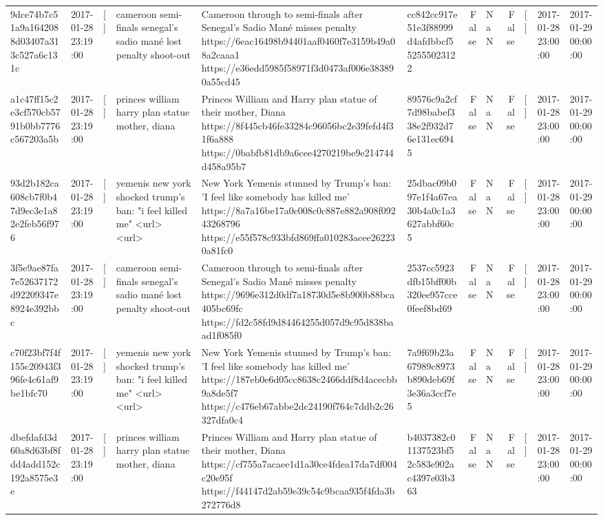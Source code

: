 \begin{tabular}{llllllrlrlll}
9dce74b7c51a9a1642088d03407a313c527a6c131c & 2017-01-28 23:19:00 & [] & cameroon semi-finals senegal's sadio mané lost penalty shoot-out & Cameroon through to semi-finals after Senegal’s Sadio Mané misses penalty https://6eac16498b94401aaf0460f7e3159b49a08a2caaa1 https://e36edd5985f58971f3d0473af006e383890a55cd45 & cc842cc917e51e3f88999d4afdbbcf552555023122 & False & NaN & False & [] & 2017-01-28 23:00:00 & 2017-01-29 00:00:00 \\
a1c47ff15c2e3cf570cb5791b0bb7776c567203a5b & 2017-01-28 23:19:00 & [] & princes william harry plan statue mother, diana & Princes William and Harry plan statue of their mother, Diana https://8f445cb46fe33284c96056bc2e39fefd4f31f6a888 https://0babfb81db9a6cee4270219be9e214744d458a95b7 & 89576c9a2cf7d98babef338e2f932d76e131ec6945 & False & NaN & False & [] & 2017-01-28 23:00:00 & 2017-01-29 00:00:00 \\
93d2b182ca608cb7f0b47d9ec3e1a82e2feb56f976 & 2017-01-28 23:19:00 & [] & yemenis new york shocked trump's ban: "i feel killed me" <url> <url> & New York Yemenis stunned by Trump's ban: 'I feel like somebody has killed me' https://8a7a16be17a0c008c0c887e882a908f09243268796 https://e55f578c933bfd869ffa010283acee262230a81fc0 & 25dbac09b097e1f4a67ea30b4a0c1a3627abbf60c5 & False & NaN & False & [] & 2017-01-28 23:00:00 & 2017-01-29 00:00:00 \\
3f5e9ae87fa7e52637172d92209347e8924e392bbc & 2017-01-28 23:19:00 & [] & cameroon semi-finals senegal's sadio mané lost penalty shoot-out & Cameroon through to semi-finals after Senegal’s Sadio Mané misses penalty https://9696e312d0df7a18730d5e8b900b88bca405bc69fc https://fd2c58fd9d84464255d057d9c95d838baad1f085f0 & 2537cc5923dfb15bff00b320ee957cce0feef8bd69 & False & NaN & False & [] & 2017-01-28 23:00:00 & 2017-01-29 00:00:00 \\
c70f23bf7f4f155c20943f396fe4c61af9be1bfc70 & 2017-01-28 23:19:00 & [] & yemenis new york shocked trump's ban: "i feel killed me" <url> <url> & New York Yemenis stunned by Trump's ban: 'I feel like somebody has killed me' https://187eb0e6d05cc8638c2466ddf8d4acecbb9a8de5f7 https://c476eb67abbe2dc24190f764c7ddb2c26327dfa0c4 & 7a9f69b23a67989c8973b890deb69f3e36a3ccf7e5 & False & NaN & False & [] & 2017-01-28 23:00:00 & 2017-01-29 00:00:00 \\
dbefdafd3d60a8d63bf8fdd4add152c192a8575e3e & 2017-01-28 23:19:00 & [] & princes william harry plan statue mother, diana & Princes William and Harry plan statue of their mother, Diana https://cf755a7acaee1d1a30ce4fdea17da7df004c20e95f https://f44147d2ab59e39c54c9bcaa935f4fda3b272776d8 & b4037382c01137523bf52c583e902ac4397e03b363 & False & NaN & False & [] & 2017-01-28 23:00:00 & 2017-01-29 00:00:00 \\

\end{tabular}
